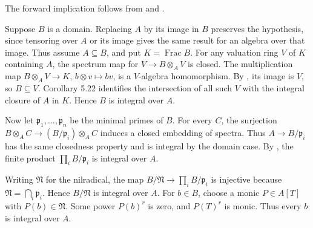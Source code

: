 The forward implication follows from  and .

Suppose $B$ is a domain. Replacing $A$ by its image in $B$ preserves the hypothesis, since tensoring over $A$ or its image gives the same result for an algebra over that image. Thus assume $A\subseteq B$, and put $K=\operatorname{Frac}B$. For any valuation ring $V$ of $K$ containing $A$, the spectrum map for $V\to B\otimes_A V$ is closed. The multiplication map $B\otimes_A V\to K$, $b\otimes v\mapsto bv$, is a $V$-algebra homomorphism. By , its image is $V$, so $B\subseteq V$. Corollary 5.22 identifies the intersection of all such $V$ with the integral closure of $A$ in $K$. Hence $B$ is integral over $A$.

Now let $\mathfrak{p}_1,\ldots,\mathfrak{p}_n$ be the minimal primes of $B$. For every $C$, the surjection $B\otimes_A C\to(B/\mathfrak{p}_i)\otimes_A C$ induces a closed embedding of spectra. Thus $A\to B/\mathfrak{p}_i$ has the same closedness property and is integral by the domain case. By , the finite product $\prod_iB/\mathfrak{p}_i$ is integral over $A$.

Writing $\mathfrak{N}$ for the nilradical, the map $B/\mathfrak{N}\to\prod_iB/\mathfrak{p}_i$ is injective because $\mathfrak{N}=\bigcap_i\mathfrak{p}_i$. Hence $B/\mathfrak{N}$ is integral over $A$. For $b\in B$, choose a monic $P\in A[T]$ with $P(b)\in\mathfrak{N}$. Some power $P(b)^r$ is zero, and $P(T)^r$ is monic. Thus every $b$ is integral over $A$.
